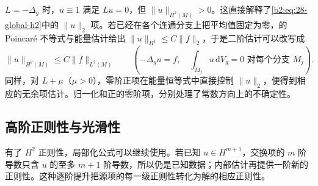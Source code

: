 \(L=-\Delta_g\) 时，\(u\equiv1\) 满足 \(Lu=0\)，但 \(\|u\|_{H^2(M)}>0\)。这直接解释了\eqref{b2:eq:28-global-h2}中的 \(\|u\|_2\) 项。若已经在各个连通分支上把平均值固定为零，的 Poincaré 不等式与能量估计给出 \(\|u\|_{H^1}\leq C\|f\|_2\)，于是二阶估计可以改写成
\[
 \|u\|_{H^2(M)}\leq C\|f\|_{L^2(M)}
 \qquad\left(-\Delta_g u=f,\quad \int_{M_j}u\,\mathrm dV_g=0\text{ 对每个分支 }M_j\right).
\]
同样，对 \(L+\mu\)（\(\mu>0\)），零阶正项在能量恒等式中直接控制 \(\|u\|_2\)，便得到相应的无余项估计。归一化和正的零阶项，分别处理了常数方向上的不确定性。

\subsection{高阶正则性与光滑性}
\label{b2:subsec:260403}

有了 \(H^2\) 正则性，局部化公式可以继续使用。若已知 \(u\in H^{m+1}\)，交换项的 \(m\) 阶导数只含 \(u\) 的至多 \(m+1\) 阶导数，所以仍是已知数据；内部估计再提供一阶新的正则性。这种逐阶提升把源项的每一级正则性转化为解的相应正则性。

